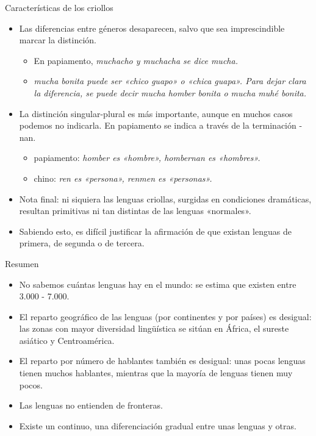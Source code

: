 \documentclass[handout]{beamer}
\begin{document}
\begin{frame}{Características de los criollos}
\begin{itemize}
	\item Las diferencias entre géneros desaparecen, salvo que sea imprescindible marcar la distinción.
	\begin{itemize}
		\item En papiamento, \it{muchacho} y \it{muchacha} se dice \it{mucha}.
		\item \it{mucha bonita} puede ser «chico guapo» o «chica guapa». Para dejar clara la diferencia, se puede decir \it{mucha homber bonita} o \it{mucha muhé bonita}.
	\end{itemize}
	\item La distinción singular-plural es más importante, aunque en muchos casos podemos no indicarla. En papiamento se indica a través de la terminación -nan. 
	\begin{itemize}
		\item papiamento: \it{homber} es «hombre», \it{hombernan} es «hombres». 
		\item chino: \it{ren} es «persona», \it{renmen} es «personas». 
	\end{itemize}
	\item Nota final: ni siquiera las lenguas criollas, surgidas en condiciones dramáticas, resultan primitivas ni tan distintas de las lenguas «normales».
	\item Sabiendo esto, es difícil justificar la afirmación de que existan lenguas de primera, de segunda o de tercera.
\end{itemize}
\end{frame}

\begin{frame}{Resumen}
\begin{itemize}
	\item No sabemos cuántas lenguas hay en el mundo: se estima que existen entre 3.000 - 7.000.
	\item El reparto geográfico de las lenguas (por continentes y por países) es desigual: las zonas con mayor diversidad lingüística se sitúan en África, el sureste asiático y Centroamérica.
	\item El reparto por número de hablantes también es desigual: unas pocas lenguas tienen muchos hablantes, mientras que la mayoría de lenguas tienen muy pocos.
	\item Las lenguas no entienden de fronteras.
	\item Existe un continuo, una diferenciación gradual entre unas lenguas y otras.
\end{itemize}
\end{frame}
\end{document}
